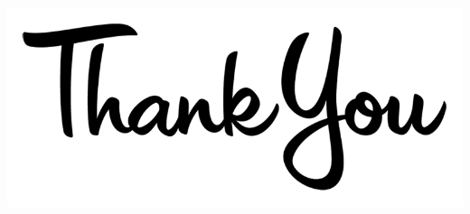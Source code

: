 \documentclass{beamer}
\begin{document}
   \begin{frame}
   \begin{center}
   \includegraphics[scale=0.3]{thanku.png}
   \end{center}
   \end{frame}
\end{document}
